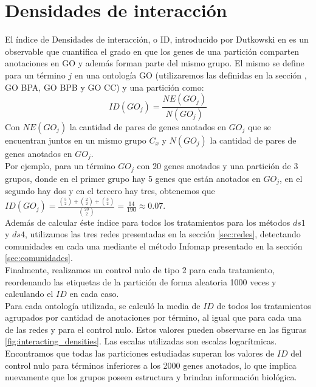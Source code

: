 \section{Densidades de interacción}
El índice de Densidades de interacción, o ID, introducido por Dutkowski en \cite{Dutkowski2013} es un observable que cuantifica el grado en que los genes de una partición comparten anotaciones en GO y además forman parte del mismo grupo. El mismo se define para un término $j$ en una ontología GO (utilizaremos las definidas en la sección \label{sec:go}, GO BPA, GO BPB y GO CC) y una partición como:
\begin{equation}
	ID(GO_j) = \frac{NE(GO_j)}{N(GO_j)}
\end{equation}
Con $NE(GO_j)$ la cantidad de pares de genes anotados en $GO_j$ que se encuentran juntos en un mismo grupo $C_x$ y $N(GO_j)$ la cantidad de pares de genes anotados en $GO_j$.\\
Por ejemplo, para un término $GO_j$ con 20 genes anotados y una partición de 3 grupos, donde en el primer grupo hay 5 genes que están anotados en $GO_j$, en el segundo hay dos y en el tercero hay tres, obtenemos que $ID(GO_j) = \frac{\binom{5}{2}+\binom{2}{2}+\binom{3}{2}}{\binom{20}{2}}=\frac{14}{190}\approx 0.07$.\\
Además de calcular éste índice para todos los tratamientos para los métodos $ds1$ y $ds4$, utilizamos las tres redes presentadas en la sección \ref{sec:redes}, detectando comunidades en cada una mediante el método Infomap presentado en la sección \ref{sec:comunidades}.\\
Finalmente, realizamos un control nulo de tipo 2 para cada tratamiento, reordenando las etiquetas de la partición de forma aleatoria 1000 veces y calculando el $ID$ en cada caso.\\
Para cada ontología utilizada, se calculó la media de $ID$ de todos los tratamientos agrupados por cantidad de anotaciones por término, al igual que para cada una de las redes y para el control nulo. Estos valores pueden observarse en las figuras \ref{fig:interacting_densities}. Las escalas utilizadas son escalas logarítmicas. Encontramos que todas las particiones estudiadas superan los valores de $ID$ del control nulo para términos inferiores a los 2000 genes anotados, lo que implica nuevamente que los grupos poseen estructura y brindan información biológica.
